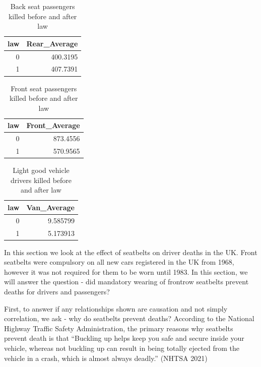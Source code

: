 \documentclass[11pt,a4paper,]{article}
\begin{document}
\begin{table}

\caption{\label{tab:RearTable}Back seat passengers killed before and after law}
\centering
\begin{tabular}[t]{r|r}
\hline
law & Rear\_Average\\
\hline
0 & 400.3195\\
\hline
1 & 407.7391\\
\hline
\end{tabular}
\end{table}

\begin{table}

\caption{\label{tab:FrontTable}Front seat passengers killed before and after law}
\centering
\begin{tabular}[t]{r|r}
\hline
law & Front\_Average\\
\hline
0 & 873.4556\\
\hline
1 & 570.9565\\
\hline
\end{tabular}
\end{table}

\begin{table}

\caption{\label{tab:VanTable}Light good vehicle drivers killed before and after law}
\centering
\begin{tabular}[t]{r|r}
\hline
law & Van\_Average\\
\hline
0 & 9.585799\\
\hline
1 & 5.173913\\
\hline
\end{tabular}
\end{table}

In this section we look at the effect of seatbelts on driver deaths in the UK. Front seatbelts were compulsory on all new cars registered in the UK from 1968, however it was not required for them to be worn until 1983. In this section, we will answer the question - did mandatory wearing of frontrow seatbelts prevent deaths for drivers and passengers?

First, to answer if any relationships shown are causation and not simply correlation, we ask - why do seatbelts prevent deaths? According to the National Highway Traffic Safety Administration, the primary reasons why seatbelts prevent death is that ``Buckling up helps keep you safe and secure inside your vehicle, whereas not buckling up can result in being totally ejected from the vehicle in a crash, which is almost always deadly.'' (NHTSA 2021)
\end{document}
